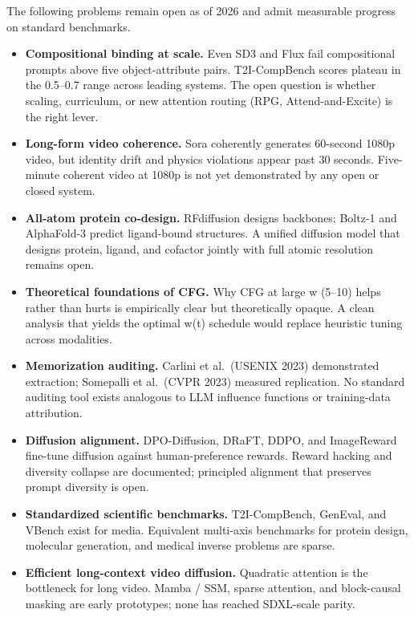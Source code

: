 The following problems remain open as of 2026 and admit measurable progress on standard benchmarks.

\begin{itemize}
\tightlist
\item
  \textbf{Compositional binding at scale.} Even SD3 and Flux fail compositional prompts above five object-attribute pairs. T2I-CompBench scores plateau in the 0.5--0.7 range across leading systems. The open question is whether scaling, curriculum, or new attention routing (RPG, Attend-and-Excite) is the right lever.
\item
  \textbf{Long-form video coherence.} Sora coherently generates 60-second 1080p video, but identity drift and physics violations appear past 30 seconds. Five-minute coherent video at 1080p is not yet demonstrated by any open or closed system.
\item
  \textbf{All-atom protein co-design.} RFdiffusion designs backbones; Boltz-1 and AlphaFold-3 predict ligand-bound structures. A unified diffusion model that designs protein, ligand, and cofactor jointly with full atomic resolution remains open.
\item
  \textbf{Theoretical foundations of CFG.} Why CFG at large w (5--10) helps rather than hurts is empirically clear but theoretically opaque. A clean analysis that yields the optimal w(t) schedule would replace heuristic tuning across modalities.
\item
  \textbf{Memorization auditing.} Carlini et al.~(USENIX 2023) demonstrated extraction; Somepalli et al.~(CVPR 2023) measured replication. No standard auditing tool exists analogous to LLM influence functions or training-data attribution.
\item
  \textbf{Diffusion alignment.} DPO-Diffusion, DRaFT, DDPO, and ImageReward fine-tune diffusion against human-preference rewards. Reward hacking and diversity collapse are documented; principled alignment that preserves prompt diversity is open.
\item
  \textbf{Standardized scientific benchmarks.} T2I-CompBench, GenEval, and VBench exist for media. Equivalent multi-axis benchmarks for protein design, molecular generation, and medical inverse problems are sparse.
\item
  \textbf{Efficient long-context video diffusion.} Quadratic attention is the bottleneck for long video. Mamba / SSM, sparse attention, and block-causal masking are early prototypes; none has reached SDXL-scale parity.
\end{itemize}

